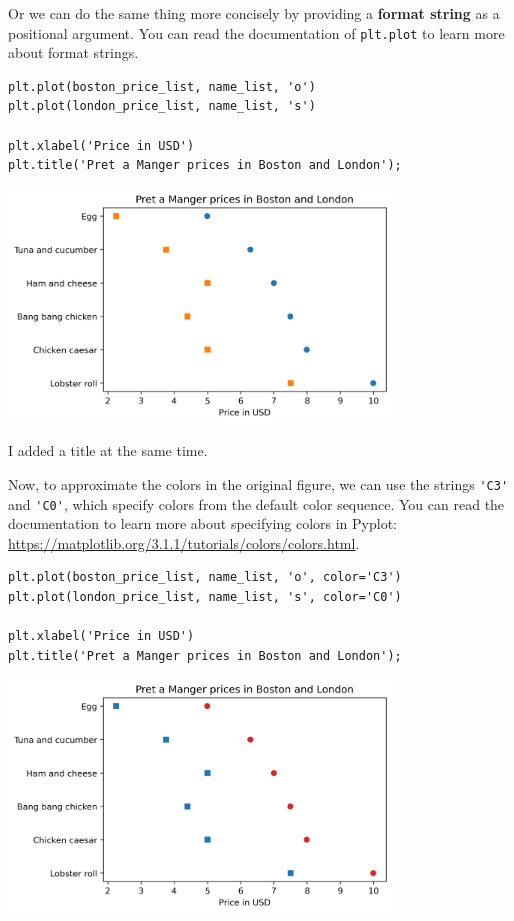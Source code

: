 Or we can do the same thing more concisely by providing a \textbf{format
string} as a positional argument. You can read the documentation of
\passthrough{\lstinline!plt.plot!} to learn more about format strings.

\begin{lstlisting}[]
plt.plot(boston_price_list, name_list, 'o')
plt.plot(london_price_list, name_list, 's')

plt.xlabel('Price in USD')
plt.title('Pret a Manger prices in Boston and London');
\end{lstlisting}

\begin{center}
\includegraphics[width=4in]{06_plotting_files/06_plotting_43_0.png}
\end{center}

I added a title at the same time.

Now, to approximate the colors in the original figure, we can use the
strings \passthrough{\lstinline!'C3'!} and
\passthrough{\lstinline!'C0'!}, which specify colors from the default
color sequence. You can read the documentation to learn more about
specifying colors in Pyplot:
\url{https://matplotlib.org/3.1.1/tutorials/colors/colors.html}.

\begin{lstlisting}[]
plt.plot(boston_price_list, name_list, 'o', color='C3')
plt.plot(london_price_list, name_list, 's', color='C0')

plt.xlabel('Price in USD')
plt.title('Pret a Manger prices in Boston and London');
\end{lstlisting}

\begin{center}
\includegraphics[width=4in]{06_plotting_files/06_plotting_45_0.png}
\end{center}

